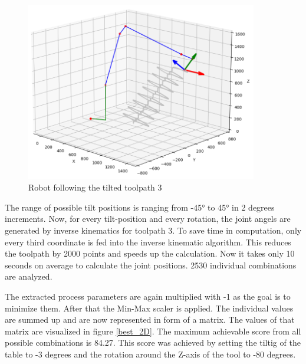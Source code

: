 \begin{figure}[H]
	\centerline{\includegraphics[width=0.9\textwidth]{figures/robotANDpath3_45.png}}
	\caption{Robot following the tilted toolpath 3}
	\label{TP3_25_robot}
\end{figure}

The range of possible tilt positions is ranging from -45° to 45° in 2 degrees increments. 
Now, for every tilt-position and every rotation, the joint angels are generated by inverse kinematics for toolpath 3. To save time in computation, only every third coordinate is fed into the inverse kinematic algorithm. This reduces the toolpath by 2000 points and speeds up the calculation. Now it takes only 10 seconds on average to calculate the joint positions. 2530 individual combinations are analyzed.

The extracted process parameters are again multiplied with -1 as the goal is to minimize them. After that the Min-Max scaler is applied. The individual values are summed up and are now represented in form of a matrix. The values of that matrix are visualized in figure \ref{best_2D}. The maximum achievable score from all possible combinations is 84.27. This score was achieved by setting the tiltig of the table to -3 degrees and the rotation around the Z-axis of the tool to -80 degrees.



